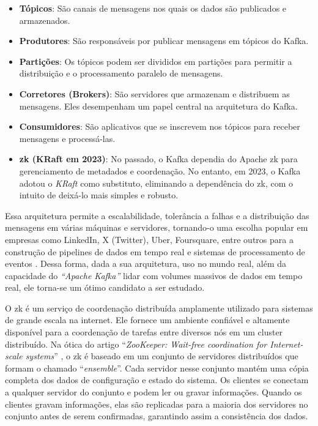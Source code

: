 \begin{itemize}
  \item \textbf{Tópicos}: São canais de mensagens nos quais os dados são publicados e armazenados.
  \item \textbf{Produtores}: São responsáveis por publicar mensagens em tópicos do Kafka.
  \item \textbf{Partições}: Os tópicos podem ser divididos em partições para permitir a distribuição e o processamento paralelo de mensagens.
  \item \textbf{Corretores (Brokers)}: São servidores que armazenam e distribuem as mensagens. Eles desempenham um papel central na arquitetura do Kafka.
  \item \textbf{Consumidores}: São aplicativos que se inscrevem nos tópicos para receber mensagens e processá-las.
  \item \textbf{\gls{zk} (KRaft em 2023)}: No passado, o Kafka dependia do Apache \gls{zk} para gerenciamento de metadados e coordenação. No entanto, em 2023, o Kafka adotou o \textit{KRaft} como substituto, eliminando a dependência do \gls{zk}, com o intuito de deixá-lo mais simples e robusto.
\end{itemize}

Essa arquitetura permite a escalabilidade, tolerância a falhas e a distribuição das mensagens em várias máquinas e servidores, tornando-o uma escolha popular em empresas como LinkedIn, X (Twitter), Uber, Foursquare, entre outros para a construção de pipelines de dados em tempo real e sistemas de processamento de eventos \cite{KafkaPoweredBy}. Dessa forma, dada a sua arquitetura, uso no mundo real, além da capacidade do \textit{``Apache Kafka''} lidar com volumes massivos de dados em tempo real, ele torna-se um ótimo candidato a ser estudado.

O \gls{zk} \cite{ZookeeperGitHub} é um serviço de coordenação distribuída amplamente utilizado para sistemas de grande escala na internet. Ele fornece um ambiente confiável e altamente disponível para a coordenação de tarefas entre diversos nós em um cluster distribuído. Na ótica do artigo ``\textit{ZooKeeper: Wait-free coordination for Internet-scale systems}'' \cite{ZooKeeperWaitFree:2010}, o \gls{zk} é baseado em um conjunto de servidores distribuídos que formam o chamado ``\textit{ensemble}''. Cada servidor nesse conjunto mantém uma cópia completa dos dados de configuração e estado do sistema. Os clientes se conectam a qualquer servidor do conjunto e podem ler ou gravar informações. Quando os clientes gravam informações, elas são replicadas para a maioria dos servidores no conjunto antes de serem confirmadas, garantindo assim a consistência dos dados. 

